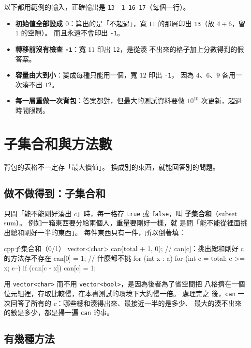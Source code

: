 以下都用範例的輸入，正確輸出是 \texttt{13 -1 16 17}（每個一行）。

\begin{itemize}
\item \textbf{初始值全部設成 $0$}：算出的是「不超過」，寬 $11$ 的那層印出
\texttt{13}（放 $4 + 6$，留 $1$ 的空隙）。 而且永遠不會印出 \texttt{-1}。
\item \textbf{轉移前沒有檢查 \texttt{-1}}：寬 $11$ 印出 \texttt{12}，是從湊
不出來的格子加上分數得到的假答案。
\item \textbf{容量由大到小}：變成每種只能用一個，寬 $12$ 印出 \texttt{-1}，
因為 $4$、$6$、$9$ 各用一次湊不出 $12$。
\item \textbf{每一層重做一次背包}：答案都對，但最大的測試資料要做 $10^{10}$
次更新，超過時間限制。
\end{itemize}

\section{子集合和與方法數}
\label{sec:knap-count}

背包的表格不一定存「最大價值」。 換成別的東西，就能回答別的問題。

\subsection{做不做得到：子集合和}

只問「能不能剛好湊出 $c$」時，每一格存 \texttt{true} 或 \texttt{false}，叫
\textbf{子集合和}（subset sum）。 例如一箱東西要分給兩個人，重量要剛好一樣，就
是問「能不能從裡面挑出總和剛好一半的東西」。 每件東西只有一件，所以倒著填：

\begin{code}{cpp}{子集合和（0/1）}
vector<char> can(total + 1, 0);   // can[c]：挑出總和剛好 c 的方法存不存在
can[0] = 1;                       // 什麼都不挑
for (int x : a) {
    for (int c = total; c >= x; c--) {
        if (can[c - x]) {
            can[c] = 1;
        }
    }
}
\end{code}

用 \texttt{vector<char>} 而不用 \texttt{vector<bool>}，是因為後者為了省空間把
八格擠在一個位元組裡，存取比較慢，在本書測試的環境下大約慢一倍。 處理完之
後，\texttt{can} 一次回答了所有的 $c$：哪些總和湊得出來、最接近一半的是多少、
最大的湊不出來的數是多少，都是掃一遍 \texttt{can} 的事。

\subsection{有幾種方法}

